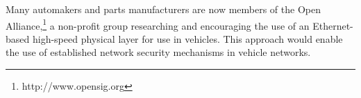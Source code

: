 
Many automakers and parts manufacturers are now members of the 
Open Alliance,\footnote{http://www.opensig.org}
a non-profit group researching and encouraging the use of an Ethernet-based high-speed physical layer 
for use in vehicles.  This approach would enable the use of 
established network security mechanisms in vehicle networks.


